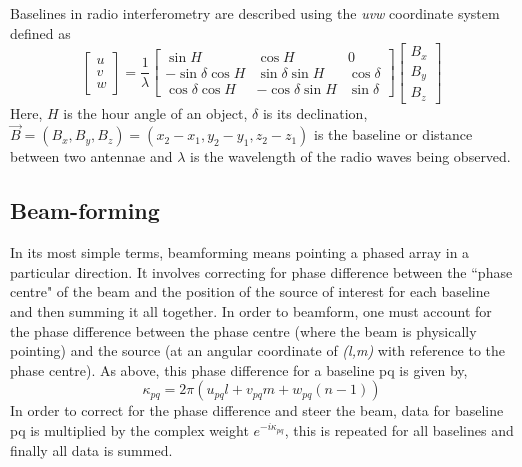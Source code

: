 Baselines in radio interferometry are described using the \textit{uvw} coordinate system defined as
\[
\begin{bmatrix}
    u \\
    v \\
    w
\end{bmatrix}
=
\dfrac{1}{\lambda}
\begin{bmatrix}
    \sin H       & \cos H & 0 \\
    -\sin \delta \cos H       & \sin \delta \sin H & \cos \delta \\
    \cos \delta \cos H       & -\cos \delta \sin H & \sin \delta
    

\end{bmatrix}
%
\begin{bmatrix}
    B_x \\
    B_y \\
    B_z
    

\end{bmatrix}
\]
Here, $H$ is the hour angle of an object, $\delta$ is its declination, $\Vec{B}=(B_x, B_y, B_z)=(x_2-x_1,y_2-y_1,z_2-z_1)$ is the baseline or distance between two antennae and $\lambda$ is the wavelength of the radio waves being observed.
\subsection{Beam-forming}
\label{sec:beamform_theory}
In its most simple terms, beamforming  means pointing a phased array in a particular direction. It involves correcting for phase difference between the ``phase centre" of the beam and the position of the source of interest for each baseline and then summing it all together. %
In order to beamform, one must account for the phase difference between the phase centre (where the beam is physically pointing) and the source (at an angular coordinate of \textit{(l,m)} with reference to the phase centre). As above, this phase difference for a baseline pq is given by, 
$$\kappa_{pq} = 2\pi(u_{pq}l+v_{pq}m+w_{pq}(n-1))$$
In order to correct for the phase difference and steer the beam, data for baseline pq is multiplied by the complex weight $e^{-i\kappa_{pq}}$, this is repeated for all baselines and finally all data is summed.
